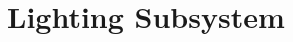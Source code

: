 \documentclass[../main]{subfiles}
\begin{document}
\chapter{Lighting Subsystem} \label{chp:lightSubsystem}

%
%
%
%
%
\end{document}
